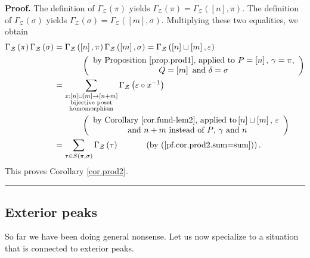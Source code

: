 \documentclass[numbers=enddot,12pt,final,onecolumn,notitlepage]{scrartcl}%
\theoremstyle{definition}
\newenvironment{proof}[1][Proof]{\noindent\textbf{#1.} }{\ \rule{0.5em}{0.5em}}
\let\sumnonlimits\sum
\renewcommand{\sum}{\sumnonlimits\limits}
\begin{document}
\begin{proof}
The definition of $\Gamma_{\mathcal{Z}}\left(  \pi\right)  $ yields
$\Gamma_{\mathcal{Z}}\left(  \pi\right)  =\Gamma_{\mathcal{Z}}\left(  \left[
n\right]  ,\pi\right)  $. The definition of $\Gamma_{\mathcal{Z}}\left(
\sigma\right)  $ yields $\Gamma_{\mathcal{Z}}\left(  \sigma\right)
=\Gamma_{\mathcal{Z}}\left(  \left[  m\right]  ,\sigma\right)  $. Multiplying
these two equalities, we obtain
\begin{align*}
\Gamma_{\mathcal{Z}}\left(  \pi\right)  \Gamma_{\mathcal{Z}}\left(
\sigma\right)   &  =\Gamma_{\mathcal{Z}}\left(  \left[  n\right]  ,\pi\right)
\Gamma_{\mathcal{Z}}\left(  \left[  m\right]  ,\sigma\right)  =\Gamma
_{\mathcal{Z}}\left(  \left[  n\right]  \sqcup\left[  m\right]  ,\varepsilon
\right) \\
&  \ \ \ \ \ \ \ \ \ \ \left(
\begin{array}
[c]{c}%
\text{by Proposition \ref{prop.prod1}, applied to }P=\left[  n\right]  \text{,
}\gamma=\pi\text{,}\\
Q=\left[  m\right]  \text{ and }\delta=\sigma
\end{array}
\right) \\
&  =\sum_{\substack{x:\left[  n\right]  \sqcup\left[  m\right]  \rightarrow
\left[  n+m\right]  \\\text{bijective poset}\\\text{homomorphism}}%
}\Gamma_{\mathcal{Z}}\left(  \varepsilon\circ x^{-1}\right) \\
&\ \ \ \ \ \ \ \ \ \ \left(
\begin{array}
[c]{c}%
\text{by Corollary \ref{cor.fund-lem2}, applied to}
\left[  n\right]  \sqcup\left[  m\right]  \text{, }\varepsilon \\
\text{ and
}n+m\text{ instead of }P\text{, }\gamma\text{ and }n
\end{array}
\right) \\
&  =\sum_{\tau\in S\left(  \pi,\sigma\right)  }\Gamma_{\mathcal{Z}}\left(
\tau\right)  \ \ \ \ \ \ \ \ \ \ \left(  \text{by (\ref{pf.cor.prod2.sum=sum}%
)}\right)  .
\end{align*}
This proves Corollary \ref{cor.prod2}.
\end{proof}

\subsection{Exterior peaks}

So far we have been doing general nonsense. Let us now specialize to a
situation that is connected to exterior peaks.
\end{document}
